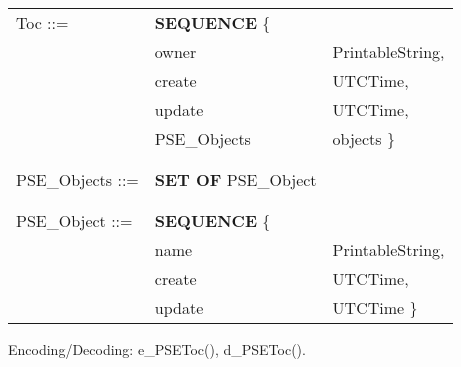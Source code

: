 {\small
\begin {center}
\begin {tabular}{lll}
Toc ::= & {\bf SEQUENCE} \{ &  \\
  & owner         & PrintableString, \\
  & create        & UTCTime,  \\
  & update        & UTCTime,  \\
  & PSE\_Objects   & objects \} \\ \\ \\
PSE\_Objects ::= & {\bf SET OF} PSE\_Object & \\ \\ \\
PSE\_Object ::= & {\bf SEQUENCE} \{ &  \\
  & name          & PrintableString, \\
  & create        & UTCTime,  \\
  & update        & UTCTime \}
\end {tabular}
\end {center}
}
 
Encoding/Decoding: e\_PSEToc(), d\_PSEToc().
